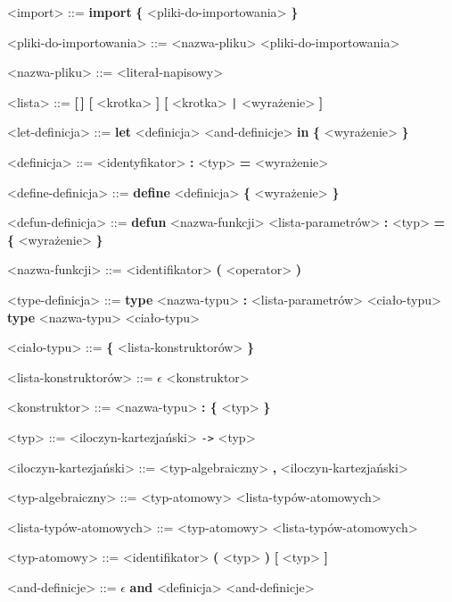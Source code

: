 \documentclass[12pt]{article}
\begin{document}
\begin{grammar}
<import> ::=
    \textbf{import} \textbf{\{} <pliki-do-importowania> \textbf{\}}

<pliki-do-importowania> ::=
    <nazwa-pliku>
     <pliki-do-importowania>

<nazwa-pliku> ::=
    <literał-napisowy>

<lista> ::=
    \textbf{[\,]}
    \alt \textbf{[} <krotka> \textbf{]}
    \alt \textbf{[} <krotka> \texttt{|} <wyrażenie> \textbf{]}

<let-definicja> ::=
    \textbf{let} <definicja> <and-definicje>
    \textbf{in} \textbf{\{} <wyrażenie> \textbf{\}} 

<definicja> ::=
    <identyfikator> \textbf{:} <typ> \textbf{=} <wyrażenie>

<define-definicja> ::=
    \textbf{define} <definicja> \textbf{\{} <wyrażenie> \textbf{\}}

<defun-definicja> ::=
    \textbf{defun} <nazwa-funkcji> <lista-parametrów> \textbf{:} <typ> 
    \textbf{= \{} <wyrażenie> \textbf{\}}

<nazwa-funkcji> ::=
    <identifikator>
    \alt \textbf{(} <operator> \textbf{)}

<type-definicja> ::=
    \textbf{type} <nazwa-typu> 
    \textbf{:} <lista-parametrów> <ciało-typu>
    \alt \textbf{type} <nazwa-typu> <ciało-typu>

<ciało-typu> ::= 
    \textbf{\{} <lista-konstruktorów> \textbf{\}}

<lista-konstruktorów> ::=
    $\epsilon$
     <konstruktor>

<konstruktor> ::=
    <nazwa-typu>
     \textbf{: \{} <typ> \textbf{\}}

<typ> ::= 
    <iloczyn-kartezjański>
     \texttt{->} <typ>

<iloczyn-kartezjański> ::=
    <typ-algebraiczny>
     \textbf{,} <iloczyn-kartezjański>

<typ-algebraiczny> ::=
    <typ-atomowy>
     <lista-typów-atomowych>

<lista-typów-atomowych> ::=
    <typ-atomowy>
     <lista-typów-atomowych>

<typ-atomowy> ::=
    <identifikator>
    \alt \textbf{(} <typ> \textbf{)}
    \alt \textbf{[} <typ> \textbf{]}

<and-definicje> ::=
    $\epsilon$
    \alt \textbf{and} <definicja> <and-definicje>


\end{grammar}
\end{document}
